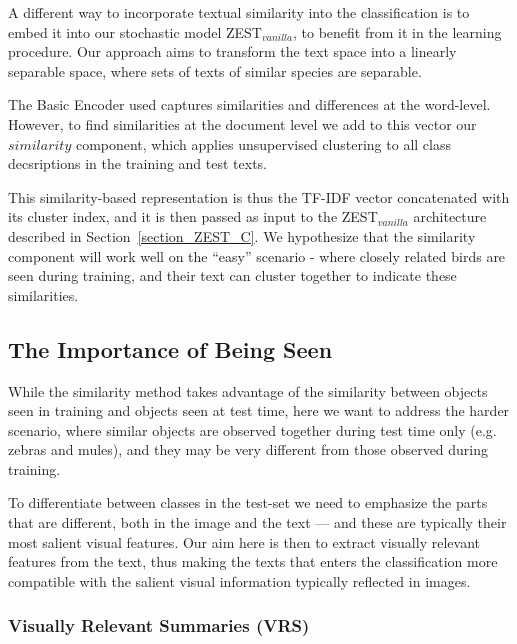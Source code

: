 \documentclass[11pt,a4paper]{article}
\newcommand\reut[1]{\textcolor{green}{\textbf{REUT:} #1 }}
\begin{document}
A different way to incorporate textual similarity into the classification is to embed it into our stochastic model ZEST$_{vanilla}$, to benefit from it in the learning procedure. Our approach aims to transform the text space into a linearly separable space, where sets of texts of similar species are separable.  


The Basic Encoder used captures similarities and differences at the word-level. However, to find similarities at the document level we add to this vector our $similarity$ component, which applies unsupervised clustering to  all class decsriptions in the training and test texts.   

This similarity-based representation is thus the TF-IDF vector concatenated with its cluster index, and it is then passed as  input to the ZEST$_{vanilla}$ architecture described in Section~\ref{section_ZEST_C}.  
We hypothesize that the similarity component will work well on the \enquote{easy} scenario - where closely related birds are seen during training,  and their text can cluster together to indicate these similarities.

\subsection{The Importance of Being Seen}

While the similarity method takes advantage of the similarity between objects seen in training and objects seen at test time, here we want to address the harder scenario, where similar objects are observed together during test time only (e.g. zebras and mules), and they may be very different from those observed during training.  

To differentiate between  classes in the test-set we need to emphasize the parts that are  different, both in the image and the text --- and these are typically their most salient visual features.  Our aim here is then to extract  visually relevant features from the text, thus making the texts that enters the classification more compatible with the salient visual information typically reflected in images. 


 
\subsubsection{Visually Relevant Summaries (VRS)}
\end{document}
